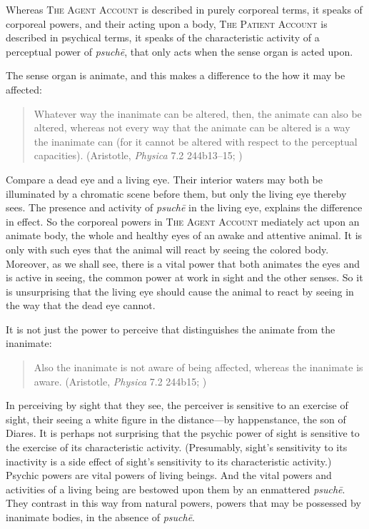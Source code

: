 Whereas \textsc{The Agent Account} is described in purely corporeal terms, it speaks of corporeal powers, and their acting upon a body, \textsc{The Patient Account} is described in psychical terms, it speaks of the characteristic activity of a perceptual power of \emph{psuchē}, that only acts when the sense organ is acted upon. 

The sense organ is animate, and this makes a difference to the how it may be affected: 
\begin{quote}
	Whatever way the inanimate can be altered, then, the animate can also be altered, whereas not every way that the animate can be altered is a way the inanimate can (for it cannot be altered with respect to the perceptual capacities). (Aristotle, \emph{Physica} 7.2 244b13–15; \citealt[129]{Reeve:2018sf})
\end{quote}
Compare a dead eye and a living eye. Their interior waters may both be illuminated by a chromatic scene before them, but only the living eye thereby sees. The presence and activity of \emph{psuchē} in the living eye, explains the difference in effect. So the corporeal powers in \textsc{The Agent Account} mediately act upon an animate body, the whole and healthy eyes of an awake and attentive animal. It is only with such eyes that the animal will react by seeing the colored body. Moreover, as we shall see, there is a vital power that both animates the eyes and is active in seeing, the common power at work in sight and the other senses. So it is unsurprising that the living eye should cause the animal to react by seeing in the way that the dead eye cannot.

It is not just the power to perceive that distinguishes the animate from the inanimate:
\begin{quote}
	Also the inanimate is not aware of being affected, whereas the inanimate is aware. (Aristotle, \emph{Physica} 7.2 244b15; \citealt[129]{Reeve:2018sf})
\end{quote}
In perceiving by sight that they see, the perceiver is sensitive to an exercise of sight, their seeing a white figure in the distance—by happenstance, the son of Diares. It is perhaps not surprising that the psychic power of sight is sensitive to the exercise of its characteristic activity. (Presumably, sight's sensitivity to its inactivity is a side effect of sight's sensitivity to its characteristic activity.) Psychic powers are vital powers of living beings. And the vital powers and activities of a living being are bestowed upon them by an enmattered \emph{psuchē}. They contrast in this way from natural powers, powers that may be possessed by inanimate bodies, in the absence of \emph{psuchē}. 

